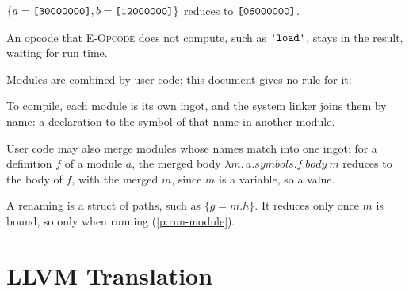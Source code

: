 \documentclass[11pt,letterpaper]{article}
\newcommand{\lam}[2]{\lambda #1.\,#2}       %
\newcommand{\rn}[1]{\textsc{#1}}                %
\newcommand{\str}[1]{\text{\ttfamily\textquotesingle #1\textquotesingle}}  %
\newcommand{\hex}[1]{\text{\ttfamily [#1]}}  %
\newcommand{\pref}[1]{\ref{#1}}  %
\begin{document}
\begin{points}
\begin{subpoints}
    $\{a = \hex{30000000}, b = \hex{12000000}\}$ reduces to $\hex{06000000}$.
  \item An opcode that \rn{E-Opcode} does not compute, such as $\str{load}$, stays in the result, waiting for
    run time.
  \end{subpoints}
\item\label{p:merge} Modules are combined by user code; this document gives no rule for it:
  \begin{subpoints}
  \item To compile, each module is its own ingot, and the system linker joins them by name: a declaration to the symbol of that name in another module.
  \item User code may also merge modules whose names match into one ingot: for a definition $f$ of a module
    $a$, the merged body
    $\lam{m}{a.\mathit{symbols}.f.\mathit{body}\ m}$ reduces to the body of $f$, with the merged $m$, since $m$ is a variable, so a value.
  \item A renaming is a struct of paths, such as $\{g = m.h\}$. It reduces only once $m$ is bound, so only
    when running (\pref{p:run-module}).
  \end{subpoints}
\end{points}


\section{LLVM Translation}\label{sec:llvm}
\end{document}
